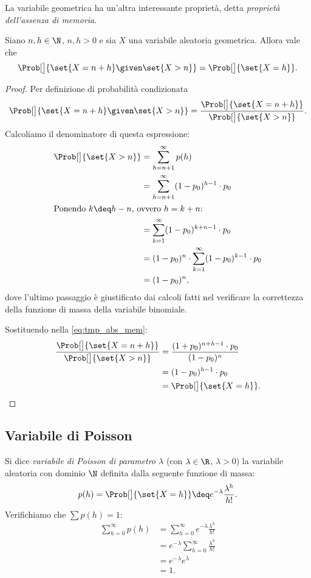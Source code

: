 La variabile geometrica ha un'altra interessante proprietà, detta \emph{proprietà dell'assenza di memoria}.
\begin{proposition}
    Siano $n, h \in \N$, $n, h > 0$ e sia $X$ una variabile aleatoria geometrica. Allora vale che \[
        \Prob[\big]{\set{X = n + h} \given \set{X > n}} = \Prob[\big]{\set{X = h}}.    
    \]
\end{proposition}
\begin{proof}
    Per definizione di probabilità condizionata \begin{equation}
        \label{eq:tmp_abs_mem}
        \Prob[\big]{\set{X = n + h} \given \set{X > n}} 
        = \frac{\Prob[\big]{\set{X = n + h}}}{\Prob[\big]{\set{X > n}}}.
    \end{equation}
    Calcoliamo il denominatore di questa espressione: \begin{align*}
        \Prob[\big]{\set{X > n}}
        &= \sum_{h = n + 1}^\infty p(h)\\
        &= \sum_{h = n + 1}^\infty (1-p_0)^{h-1}\cdot p_0\\
        \intertext{Ponendo $k \deq h - n$, ovvero $h = k + n$:}
        &= \sum_{k = 1}^\infty (1-p_0)^{k+n-1} \cdot p_0\\
        &= (1 - p_0)^n \cdot \sum_{k = 1}^\infty (1-p_0)^{k-1}\cdot p_0\\
        &= (1 - p_0)^n,
    \end{align*}
    dove l'ultimo passaggio è giustificato dai calcoli fatti nel verificare la correttezza della funzione di massa della variabile binomiale.

    Sostituendo nella \eqref{eq:tmp_abs_mem}: \begin{align*}
        \frac{\Prob[\big]{\set{X = n + h}}}{\Prob[\big]{\set{X > n}}}
        &= \frac{(1+p_0)^{n+h-1} \cdot p_0}{(1-p_0)^n}\\
        &= (1-p_0)^{h-1}\cdot p_0\\
        &= \Prob[\big]{\set{X = h}}. \qedhere
    \end{align*}
\end{proof}

\subsection{Variabile di Poisson}
Si dice \emph{variabile di Poisson di parametro $\lambda$} (con $\lambda \in \R$, $\lambda > 0$) la variabile aleatoria con dominio $\N$ definita dalla seguente funzione di massa: \[
    p(h) = \Prob[\big]{\set{X = h}} \deq e^{-\lambda}\frac{\lambda^h}{h!}.    
\]
Verifichiamo che $\sum p(h) = 1$: \begin{align*}
    \sum_{h = 0}^\infty p(h)
    &= \sum_{h = 0}^\infty e^{-\lambda}\frac{\lambda^h}{h!}\\
    &= e^{-\lambda} \sum_{h = 0}^\infty \frac{\lambda^h}{h!}\\
    &= e^{-\lambda}e^{\lambda}\\
    &= 1.
\end{align*}

